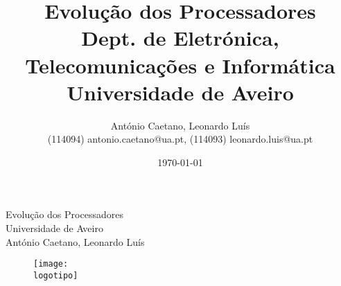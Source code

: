 \documentclass{report}
\begin{document}
%
\def\titulo{Evolução dos Processadores}
\def\data{DATA}
\def\autores{António Caetano, Leonardo Luís}
\def\autorescontactos{(114094) antonio.caetano@ua.pt, (114093) leonardo.luis@ua.pt}
\def\versao{VERSAO}
\def\departamento{Dept. de Eletrónica, Telecomunicações e Informática}
\def\empresa{Universidade de Aveiro}
\def\logotipo{ua.pdf}
%
%
\begin{titlepage}

\begin{center}
%
\vspace*{50mm}
%
{\Huge \titulo}\\ 
%
\vspace{10mm}
%
{\Large \empresa}\\
%
\vspace{10mm}
%
{\LARGE \autores}\\ 
%
\vspace{30mm}
%
\begin{figure}[h]
\center
\texttt{[image: \\logotipo]}
\end{figure}
%
\vspace{30mm}
\end{center}
%
\begin{flushright}
\end{flushright}
\end{titlepage}

\title{%
{\Huge\textbf{\titulo}}\\
{\Large \departamento\\ \empresa}
}
%
\author{%
    \autores \\
    \autorescontactos
}
%
\date{\today}
%
\maketitle

\end{document}
